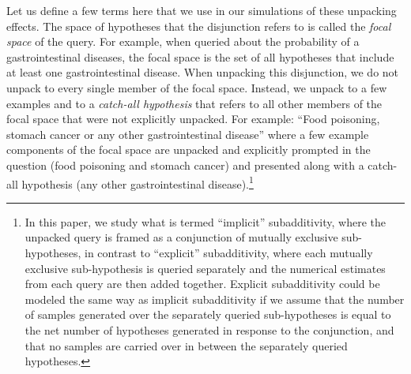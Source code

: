 Let us define a few terms here that we use in our simulations of these unpacking effects. The space of hypotheses that the disjunction refers to is called the \textit{focal space} of the query. For example, when queried about the probability of a gastrointestinal diseases, the focal space is the set of all hypotheses that include at least one gastrointestinal disease. When unpacking this disjunction, we do not unpack to every single member of the focal space. Instead, we unpack to a few examples and to a \emph{catch-all hypothesis} that refers to all other members of the focal space that were not explicitly unpacked. 
For example: ``Food poisoning, stomach cancer or any other gastrointestinal disease'' where a few example components of the focal space are unpacked and explicitly prompted in the question (food poisoning and stomach cancer) and presented along with a catch-all hypothesis (any other gastrointestinal disease).\footnote{In this paper, we study what is termed ``implicit'' subadditivity, where the unpacked query is framed as a conjunction of mutually exclusive sub-hypotheses, in contrast to ``explicit'' subadditivity, where each mutually exclusive sub-hypothesis is queried separately and the numerical estimates from each query are then added together. Explicit subadditivity could be modeled the same way as implicit subadditivity if we assume that the number of samples generated over the separately queried sub-hypotheses is equal to the net number of hypotheses generated in response to the conjunction, and that no samples are carried over in between the separately queried hypotheses.}

